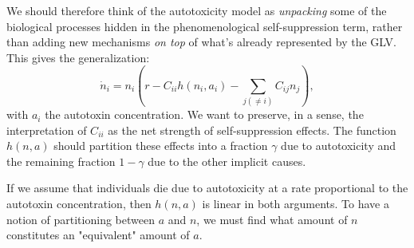 \documentclass[11pt,a4paper,fleqn]{scrartcl}
\begin{document}
We should therefore think of the autotoxicity model as \emph{unpacking} some of the biological processes hidden in the phenomenological self-suppression term, rather than adding new mechanisms \emph{on top} of what's already represented by the GLV. This gives the generalization:
\begin{equation}
\dot{n}_i = n_i\left( r - C_{ii} h(n_i,a_i) - \sum_{j(\neq i)} C_{ij} n_j \right),
\end{equation}
with $a_i$ the autotoxin concentration. We want to preserve, in a sense, the interpretation of $C_{ii}$ as the net strength of self-suppression effects. The function $h(n,a)$ should partition these effects into a fraction $\gamma$ due to autotoxicity and the remaining fraction $1-\gamma$ due to the other implicit causes.

If we assume that individuals die due to autotoxicity at a rate proportional to the autotoxin concentration, then $h(n,a)$ is linear in both arguments. To have a notion of partitioning between $a$ and $n$, we must find what amount of $n$ constitutes an "equivalent" amount of $a$.
\end{document}
